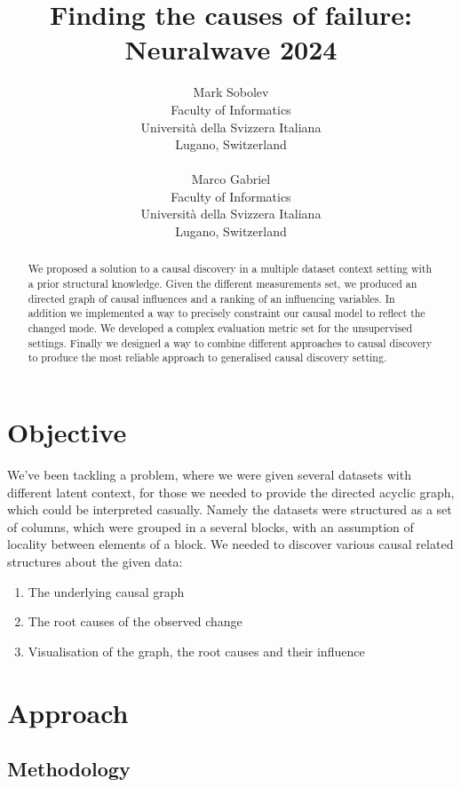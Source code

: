 \documentclass{article}
\title{Finding the causes of failure: Neuralwave 2024}
\author{
	Mark Sobolev\\
	Faculty of Informatics\\
	Università della Svizzera Italiana\\
	Lugano, Switzerland \\
	\\
	\And
	Marco Gabriel \\
	Faculty of Informatics \\
	Università della Svizzera Italiana\\
	Lugano, Switzerland \\
}
\begin{document}
	
	
	\maketitle
	

	\begin{abstract}
		We proposed a solution to a causal discovery in a multiple dataset context setting with a prior structural knowledge. Given the different measurements set, we produced an directed graph of causal influences and a ranking of an influencing variables. In addition we implemented a way to precisely constraint our causal model to reflect the changed mode. We developed a complex evaluation metric set for the unsupervised settings. Finally we designed a way to combine different approaches to causal discovery to produce the most reliable approach to generalised causal discovery setting.
	\end{abstract}
	
	
	\section{Objective} %
	
	We've been tackling a problem, where we were given several datasets with different latent context, for those we needed to provide the directed acyclic graph, which could be interpreted casually. Namely the datasets were structured as a set of columns, which were grouped in a several blocks, with an assumption of locality between elements of a block. We needed to discover various causal related structures about the given data:
	
	\begin{enumerate}
		\item The underlying causal graph
		\item The root causes of the observed change
		\item Visualisation of the graph, the root causes and their influence
	\end{enumerate}


    \section{Approach} %

    \subsection{Methodology}
\end{document}
